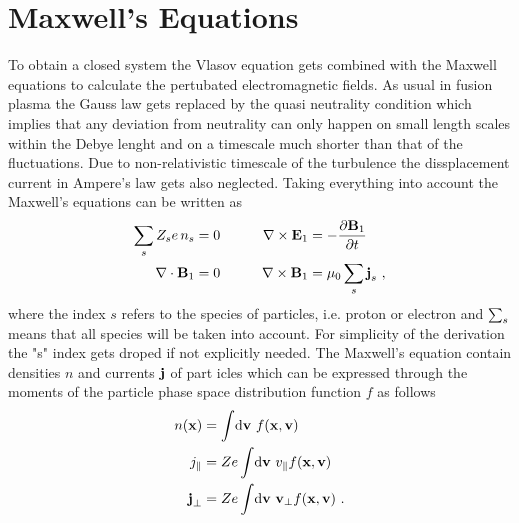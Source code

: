 \section{Maxwell's Equations}
\label{sec:maxwellEquations}

To obtain a closed system the Vlasov equation gets combined with the Maxwell equations to calculate the pertubated electromagnetic fields. As usual in fusion plasma the Gauss law gets replaced by the quasi neutrality condition which implies that any deviation from neutrality can only happen on small length scales within the Debye lenght and on a timescale much shorter than that of the fluctuations. Due to non-relativistic timescale of the turbulence the dissplacement current in Ampere's law gets also neglected. Taking everything into account the Maxwell's equations can be written as
\begin{gather}
	\begin{aligned}
		\sum_s Z_s e \, n_s &= 0  &\qquad \nabla \times \boldsymbol{\mathbf{E}}_1 &= - \frac{\partial \boldsymbol{\mathbf{B}}_1}{\partial t}\\
		\nabla \cdot \boldsymbol{\mathbf{B}}_1 &= 0 &\qquad \nabla \times \boldsymbol{\mathbf{B}}_1 &= \mu_0 \sum_s \boldsymbol{\mathbf{j}}_s~,
	\end{aligned}
	\label{eq:maxwellEquations}
\end{gather}
where the index $s$ refers to the species of particles, i.e. proton or electron and $\sum_s$ means that all species will be taken into account. For simplicity of the derivation the "s" index gets droped if not explicitly needed. The Maxwell's equation contain densities $n$ and currents $\boldsymbol{\mathbf{j}}$ of part icles which can be expressed through the moments of the particle phase space distribution function $f$ as follows
\begin{gather}
	\begin{aligned}
		n(\boldsymbol{\mathbf{x}}) &= \int \! \mathrm{d}\boldsymbol{\mathbf{v}} ~ f(\boldsymbol{\mathbf{x}}, \boldsymbol{\mathbf{v}}) \\
		j_\parallel &= Ze \int \! \mathrm{d}\boldsymbol{\mathbf{v}} ~ v_\parallel f(\boldsymbol{\mathbf{x}}, \boldsymbol{\mathbf{v}}) \\
		\boldsymbol{\mathbf{j}}_\perp &= Ze \int \! \mathrm{d}\boldsymbol{\mathbf{v}} ~ \boldsymbol{\mathbf{v}}_\perp f(\boldsymbol{\mathbf{x}}, \boldsymbol{\mathbf{v}})~.
	\end{aligned}
	\label{eq:momentsParticleSpace}
\end{gather}
\newpage